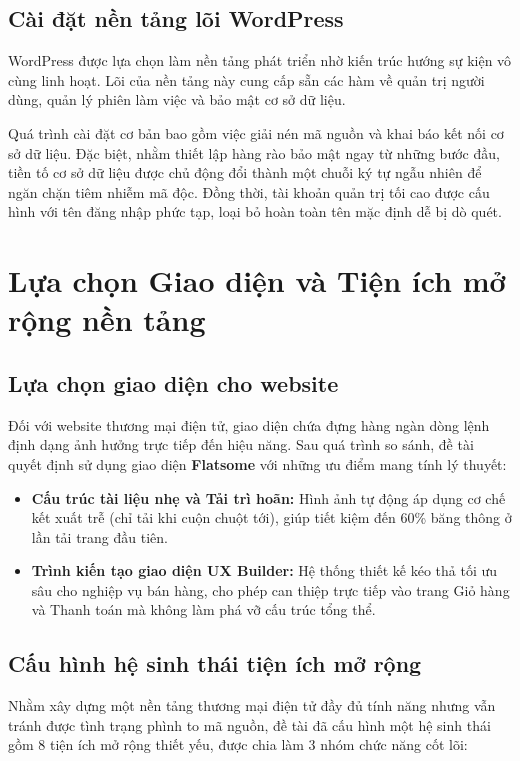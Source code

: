 \subsection{Cài đặt nền tảng lõi WordPress}
WordPress được lựa chọn làm nền tảng phát triển nhờ kiến trúc hướng sự kiện vô cùng linh hoạt. Lõi của nền tảng này cung cấp sẵn các hàm về quản trị người dùng, quản lý phiên làm việc và bảo mật cơ sở dữ liệu. 

Quá trình cài đặt cơ bản bao gồm việc giải nén mã nguồn và khai báo kết nối cơ sở dữ liệu. Đặc biệt, nhằm thiết lập hàng rào bảo mật ngay từ những bước đầu, tiền tố cơ sở dữ liệu được chủ động đổi thành một chuỗi ký tự ngẫu nhiên để ngăn chặn tiêm nhiễm mã độc. Đồng thời, tài khoản quản trị tối cao được cấu hình với tên đăng nhập phức tạp, loại bỏ hoàn toàn tên mặc định dễ bị dò quét.

\section{Lựa chọn Giao diện và Tiện ích mở rộng nền tảng}

\subsection{Lựa chọn giao diện cho website}
Đối với website thương mại điện tử, giao diện chứa đựng hàng ngàn dòng lệnh định dạng ảnh hưởng trực tiếp đến hiệu năng. Sau quá trình so sánh, đề tài quyết định sử dụng giao diện \textbf{Flatsome} \cite{theme_flatsome} với những ưu điểm mang tính lý thuyết:
\begin{itemize}
	\item \textbf{Cấu trúc tài liệu nhẹ và Tải trì hoãn:} Hình ảnh tự động áp dụng cơ chế kết xuất trễ (chỉ tải khi cuộn chuột tới), giúp tiết kiệm đến 60\% băng thông ở lần tải trang đầu tiên.
	\item \textbf{Trình kiến tạo giao diện UX Builder:} Hệ thống thiết kế kéo thả tối ưu sâu cho nghiệp vụ bán hàng, cho phép can thiệp trực tiếp vào trang Giỏ hàng và Thanh toán mà không làm phá vỡ cấu trúc tổng thể.
\end{itemize}

\subsection{Cấu hình hệ sinh thái tiện ích mở rộng}
Nhằm xây dựng một nền tảng thương mại điện tử đầy đủ tính năng nhưng vẫn tránh được tình trạng phình to mã nguồn, đề tài đã cấu hình một hệ sinh thái gồm 8 tiện ích mở rộng thiết yếu, được chia làm 3 nhóm chức năng cốt lõi:

